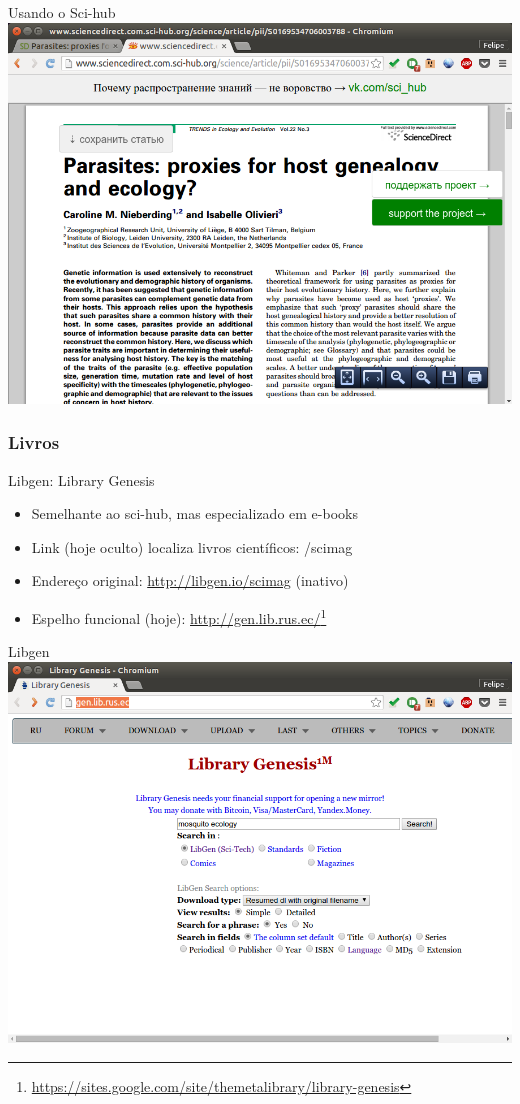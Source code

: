 \documentclass{beamer}
\begin{document}
\begin{frame}{Usando o Sci-hub}
  \centering
  \includegraphics[height=.85\textheight]{Busca/scihub-busca3}
\end{frame}

\subsubsection{Livros}

\begin{frame}{Libgen: Library Genesis}
  \begin{itemize}
    \footnotesize
  \item Semelhante ao sci-hub, mas especializado em e-books
  \item Link (hoje oculto) localiza livros científicos:
    \alert{/scimag}
  \item Endereço original: \url{http://libgen.io/scimag} (inativo)
  \item Espelho funcional (hoje): \url{http://gen.lib.rus.ec/}\footnote{\url{https://sites.google.com/site/themetalibrary/library-genesis}}
  \end{itemize}
\end{frame}

\begin{frame}{Libgen}
  \centering
  \includegraphics[height=.85\textheight]{Busca/libgen-busca1}
\end{frame}
\end{document}
